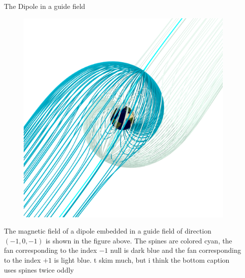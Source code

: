 \documentclass[final]{beamer}
\newlength{\onecolwid}
\newlength{\twocolwid}
\begin{document}
\begin{frame}[t]
\begin{columns}[t]
\begin{column}{\twocolwid}
\begin{columns}[t,totalwidth=\twocolwid]
\begin{column}{\onecolwid}
\end{column} %

\begin{column}{\onecolwid} %

\begin{block}{The Dipole in a guide field}
    \begin{figure}
    \includegraphics[width=\onecolwid]{fig/separatrix_dipole.png}
    \end{figure}

    The magnetic field of a dipole embedded in a guide field of direction $(-1,0,-1)$ is
    shown in the figure above. 
    The spines are colored cyan, the fan corresponding to the
    index $-1$ null is dark blue and the fan corresponding to the
    index $+1$ is light blue. t skim much, but i think the bottom caption uses spines twice oddly


\end{block}



\end{column}
\end{columns}
\end{column}
\end{columns}
\end{frame}
\end{document}

